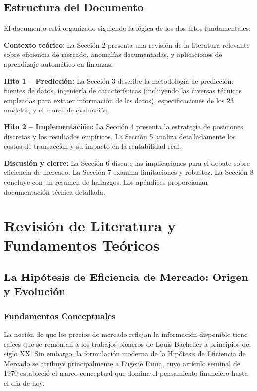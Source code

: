 \documentclass[11pt,a4paper]{article}
\begin{document}
\subsection{Estructura del Documento}

El documento está organizado siguiendo la lógica de los dos hitos fundamentales:

\textbf{Contexto teórico:} La Sección 2 presenta una revisión de la literatura relevante sobre eficiencia de mercado, anomalías documentadas, y aplicaciones de aprendizaje automático en finanzas.

\textbf{Hito 1 -- Predicción:} La Sección 3 describe la metodología de predicción: fuentes de datos, ingeniería de características (incluyendo las diversas técnicas empleadas para extraer información de los datos), especificaciones de los 23 modelos, y el marco de evaluación.

\textbf{Hito 2 -- Implementación:} La Sección 4 presenta la estrategia de posiciones discretas y los resultados empíricos. La Sección 5 analiza detalladamente los costos de transacción y su impacto en la rentabilidad real.

\textbf{Discusión y cierre:} La Sección 6 discute las implicaciones para el debate sobre eficiencia de mercado. La Sección 7 examina limitaciones y robustez. La Sección 8 concluye con un resumen de hallazgos. Los apéndices proporcionan documentación técnica detallada.

\section{Revisión de Literatura y Fundamentos Teóricos}

\subsection{La Hipótesis de Eficiencia de Mercado: Origen y Evolución}

\subsubsection{Fundamentos Conceptuales}

La noción de que los precios de mercado reflejan la información disponible tiene raíces que se remontan a los trabajos pioneros de Louis Bachelier a principios del siglo XX. Sin embargo, la formulación moderna de la Hipótesis de Eficiencia de Mercado se atribuye principalmente a Eugene Fama, cuyo artículo seminal de 1970 estableció el marco conceptual que domina el pensamiento financiero hasta el día de hoy.
\end{document}
